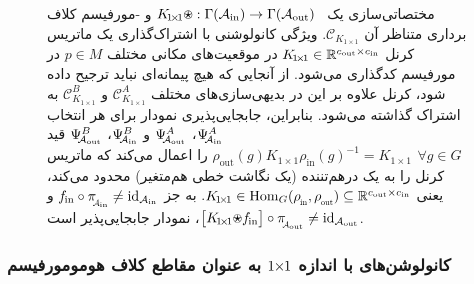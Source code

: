 \begin{figure}
\begin{tikzcd}
    \end{tikzcd}
    \caption{\small
        مختصاتی‌سازی یک \onexoneGM\ $K_{\!1\!\times\!1} \protect\ostar: \Gamma(\Ain) \to \Gamma(\Aout)$ و -مورفیسم کلاف برداری متناظر آن $\mathcal{C}_{K_{\!1\!\times\!1}}$.
        ویژگی کانولوشنی با اشتراک‌گذاری یک ماتریس کرنل $K_{\!1\!\times\!1}\in\R^{\cout\times\cin}$ در موقعیت‌های مکانی مختلف $p\in M$ در مورفیسم کدگذاری می‌شود.
        از آنجایی که هیچ پیمانه‌ای نباید ترجیح داده شود، کرنل علاوه بر این در بدیهی‌سازی‌های مختلف
        $\mathcal{C}_{K_{\!1\!\times\!1}}^A$ و $\mathcal{C}_{K_{\!1\!\times\!1}}^B$ به اشتراک گذاشته می‌شود.
        بنابراین، جابجایی‌پذیری نمودار برای هر انتخاب
        $\Psi_{\!\!\A_\text{in} }^A$،
        $\Psi_{\!\!\A_\text{out}}^A$ و
        $\Psi_{\!\!\A_\text{in} }^B$،
        $\Psi_{\!\!\A_\text{out}}^B$
        قید
        $\rho_\text{out}(g) K_{\!1\!\times\!1} \rho_\text{in}(g)^{-1} = K_{\!1\!\times\!1}\,\ \forall g\!\in G$
        را اعمال می‌کند که ماتریس کرنل را به یک درهم‌تننده (یک نگاشت خطی هم‌متغیر) محدود می‌کند، یعنی
        $K_{\!1\!\times\!1} \in \Hom_G(\rhoin,\rhoout) \subseteq \R^{\cout\times\cin}$.
        به جز $\fin \circ \piAin \neq \id_{\Ain}$ و $\big[K_{\!1\!\times\!1} \protect\ostar \fin\big] \circ \piAout \neq \id_{\Aout}$، نمودار جابجایی‌پذیر است.
    }
    \label{fig:triv_bundle_morphism_onexone}
\end{figure}










\subsubsection[\texorpdfstring{کانولوشن‌های \lr{GM} با اندازه ${1\kern-2.7pt\times\kern-2.9pt1}$}{1x1} به عنوان مقاطع کلاف هومومورفیسم]%
          {کانولوشن‌های  با اندازه \texorpdfstring{${1\kern-2.7pt\times\kern-2.9pt1}$}{1x1} به عنوان مقاطع کلاف هومومورفیسم}
\label{sec:onexone_hom_section}


